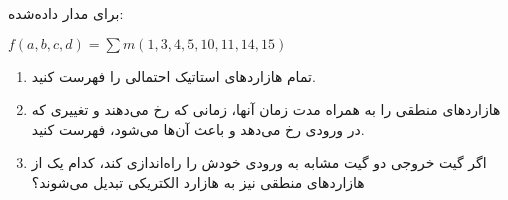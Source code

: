 برای مدار داده‌شده:

\begin{latin}
	$f(a,b,c,d)=\sum m(1,3,4,5,10,11,14,15)$
\end{latin}


\begin{enumerate}
	\item 
	تمام هازاردهای استاتیک احتمالی را فهرست کنید.
	
	
	
	
	\item 
	هازاردهای منطقی را به همراه مدت زمان آنها، زمانی که رخ می‌دهند و تغییری که در ورودی رخ می‌دهد و باعث آن‌ها می‌شود، فهرست کنید.
	
	\item 
	اگر گیت خروجی دو گیت مشابه به ورودی خودش را راه‌اندازی کند، کدام یک از هازاردهای منطقی نیز به هازارد الکتریکی تبدیل می‌شوند؟
\end{enumerate}